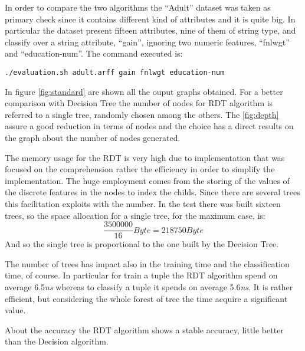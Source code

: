 \documentclass{acm_proc_article-sp-sigmod07}
\begin{document}
In order to compare the two algorithms the ``Adult'' dataset was taken as
primary check since it contains different kind of attributes and it is
quite big. In particular the dataset present fifteen attributes, nine of
them of string type, and classify over a string attribute, ``gain'',
ignoring two numeric features, ``fnlwgt'' and ``education-num''. The
command executed is:
\begin{verbatim}
./evaluation.sh adult.arff gain fnlwgt education-num
\end{verbatim}

In figure \ref{fig:standard} are shown all the ouput graphs obtained. 
For a better comparison with Decision Tree the number of nodes for RDT
algorithm is referred to a single tree, randomly chosen among the others.
The \ref{fig:depth} assure a good reduction in terms of nodes and the
choice has a direct results on the graph about the number of nodes
generated.

The memory usage for the RDT is very high due to implementation that was
focused on the comprehension rather the efficiency in order to simplify
the implementation. The huge employment comes from the storing of the
values of the discrete features in the nodes to index the childs. Since
there are several trees this facilitation exploits with the number. In the
test there was built sixteen trees, so the space allocation for a single
tree, for the maximum case, is:
$$ \frac{3500000}{16} Byte = 218750 Byte$$
And so the single tree is proportional to the one built by the Decision
Tree.

The number of trees has impact also in the training time and the
classification time, of course. In particular for train a tuple the RDT
algorithm spend on average 6.5\emph{ns} whereas to classify a tuple it
spends on average 5.6\emph{ns}. It is rather efficient, but considering
the whole forest of tree the time acquire a significant value.

About the accuracy the RDT algorithm shows a stable accuracy, little
better than the Decision algorithm.

\begin{figure*}
\label{fig:standard}
\centering
{}
\caption{Running the framework on the Adult dataset classifying over gain
and ignoring the attributes: fnlwgt and education-num}
\end{figure*}
\end{document}
